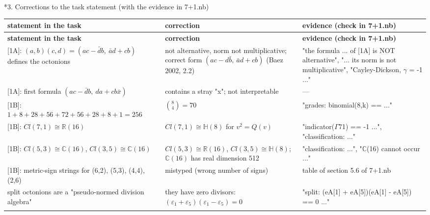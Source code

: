 \documentclass[10pt,a4paper]{article}
\makeatletter
\renewcommand\section{\@startsection{section}{1}{\z@}{-3.5ex \@plus -1ex \@minus -.2ex}{2.3ex \@plus.2ex}{\normalfont\Large\bfseries\raggedright}}
\makeatother
\begin{document}
\section*{3. Corrections to the task statement (with the evidence in 7+1.nb)}
{\footnotesize
\begin{longtable}{>{\raggedright\arraybackslash}p{}>{\raggedright\arraybackslash}p{}>{\raggedright\arraybackslash}p{}}
\toprule
\textbf{statement in the task} & \textbf{correction} & \textbf{evidence (check in 7+1.nb)} \\
\midrule\endfirsthead
\toprule
\textbf{statement in the task} & \textbf{correction} & \textbf{evidence (check in 7+1.nb)} \\
\midrule\endhead
\endfoot
\bottomrule\endlastfoot
{}[1A]: $(a,b)(c,d)=(ac-\bar d b,\ \bar a d+cb)$ defines the octonions & not alternative, norm not multiplicative; correct form $(ac-d\bar b,\ \bar a d+cb)$ (Baez 2002, 2.2) & "the formula ... of [1A] is NOT alternative", "... its norm is not multiplicative", "Cayley-Dickson, \texorpdfstring{\ensuremath{\gamma}}{γ} = -1 ..." \\
{}[1A]: first formula $(ac-\bar d b,\ da+cb\bar x)$ & contains a stray "x"; not interpretable & — \\
{}[1B]: $1+8+28+56+72+56+28+8+1=256$ & $\binom84=70$ & "grades: binomial(8,k) == ..." \\
{}[1B]: $Cl(7,1)\cong\mathbb R(16)$ & $Cl(7,1)\cong\mathbb H(8)$ for $v^2=Q(v)$ & "indicator(\texorpdfstring{\ensuremath{\Gamma}}{Γ}71) == -1 ...", "classification: ..." \\
{}[1B]: $Cl(5,3)\cong\mathbb C(16)$, $Cl(3,5)\cong\mathbb C(16)$ & $Cl(5,3)\cong\mathbb R(16)$, $Cl(3,5)\cong\mathbb H(8)$; $\mathbb C(16)$ has real dimension 512 & "classification: ...", "\texorpdfstring{\ensuremath{\mathbb{C}}}{ℂ}(16) cannot occur ..." \\
{}[1B]: metric-sign strings for (6,2), (5,3), (4,4), (2,6) & mistyped (wrong number of signs) & table of section 5.6 of 7+1.nb \\
split octonions are a "pseudo-normed division algebra" & they have zero divisors: $(\varepsilon_1+\varepsilon_5)(\varepsilon_1-\varepsilon_5)=0$ & "split: (eA[1] + eA[5])(eA[1] - eA[5]) == 0 ..." \\*
\end{longtable}}
\end{document}
